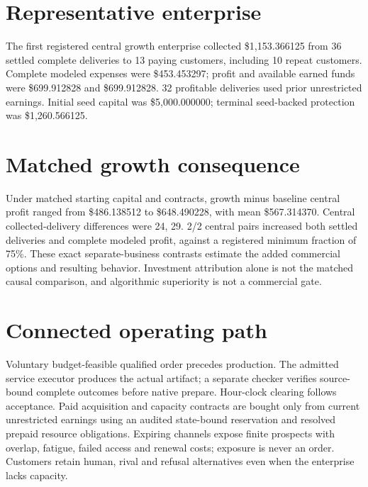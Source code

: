 \documentclass[10pt,letterpaper]{article}
\begin{document}
\section{Representative enterprise}
The first registered central growth enterprise collected \$1,153.366125 from 36 settled complete deliveries to 13 paying customers, including 10 repeat customers. Complete modeled expenses were \$453.453297; profit and available earned funds were \$699.912828 and \$699.912828. 32 profitable deliveries used prior unrestricted earnings. Initial seed capital was \$5,000.000000; terminal seed-backed protection was \$1,260.566125.
\section{Matched growth consequence}
Under matched starting capital and contracts, growth minus baseline central profit ranged from \$486.138512 to \$648.490228, with mean \$567.314370. Central collected-delivery differences were 24, 29. 2/2 central pairs increased both settled deliveries and complete modeled profit, against a registered minimum fraction of 75\%. These exact separate-business contrasts estimate the added commercial options and resulting behavior. Investment attribution alone is not the matched causal comparison, and algorithmic superiority is not a commercial gate.
\section{Connected operating path}
Voluntary budget-feasible qualified order precedes production. The admitted service executor produces the actual artifact; a separate checker verifies source-bound complete outcomes before native prepare. Hour-clock clearing follows acceptance. Paid acquisition and capacity contracts are bought only from current unrestricted earnings using an audited state-bound reservation and resolved prepaid resource obligations. Expiring channels expose finite prospects with overlap, fatigue, failed access and renewal costs; exposure is never an order. Customers retain human, rival and refusal alternatives even when the enterprise lacks capacity.
\end{document}
